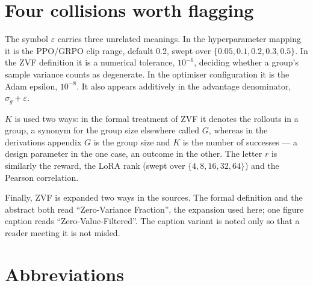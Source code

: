 \documentclass[12pt,a4paper]{report}
\begin{document}
\section{Four collisions worth
flagging}\label{four-collisions-worth-flagging}

The symbol \(\varepsilon\) carries three unrelated meanings. In the
hyperparameter mapping it is the PPO/GRPO clip range, default 0.2, swept
over \(\{0.05, 0.1, 0.2, 0.3, 0.5\}\). In the ZVF definition it is a
numerical tolerance, \(10^{-6}\), deciding whether a group's sample
variance counts as degenerate. In the optimiser configuration it is the
Adam epsilon, \(10^{-8}\). It also appears additively in the advantage
denominator, \(\sigma_g + \varepsilon\).

\(K\) is used two ways: in the formal treatment of ZVF it denotes the
rollouts in a group, a synonym for the group size elsewhere called
\(G\), whereas in the derivations appendix \(G\) is the group size and
\(K\) is the number of successes --- a design parameter in the one case,
an outcome in the other. The letter \(r\) is similarly the reward, the
LoRA rank (swept over \(\{4,8,16,32,64\}\)) and the Pearson correlation.

Finally, ZVF is expanded two ways in the sources. The formal definition
and the abstract both read ``Zero-Variance Fraction'', the expansion
used here; one figure caption reads ``Zero-Value-Filtered''. The caption
variant is noted only so that a reader meeting it is not misled.

\section{Abbreviations}\label{abbreviations}
\end{document}
